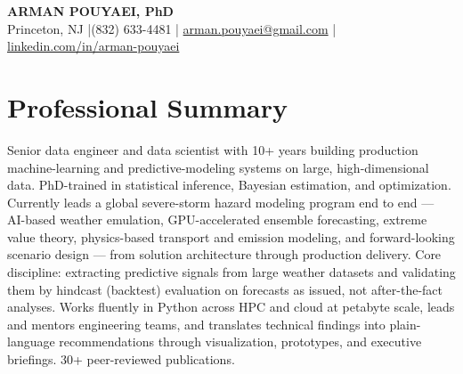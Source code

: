 \documentclass[10pt]{article}
\begin{document}
\fontsize{9}{10.3}\selectfont

\begin{center}
  {\large\bfseries ARMAN POUYAEI, PhD}\\[0.5ex]
  {\footnotesize Princeton, NJ \enspace|\enspace (832) 633-4481 \enspace|\enspace
  \href{mailto:arman.pouyaei@gmail.com}{arman.pouyaei@gmail.com} \enspace|\enspace
  \href{https://linkedin.com/in/arman-pouyaei}{linkedin.com/in/arman-pouyaei}}
\end{center}

\section*{Professional Summary}
Senior data engineer and data scientist with 10+ years building production
machine-learning and predictive-modeling systems on large, high-dimensional
data. PhD-trained in statistical inference, Bayesian estimation, and
optimization. Currently leads a global severe-storm hazard modeling program
end to end --- AI-based weather emulation, GPU-accelerated ensemble
forecasting, extreme value theory, physics-based transport and emission
modeling, and forward-looking scenario design --- from solution architecture
through production delivery. Core discipline: extracting predictive
signals from large weather datasets and validating them by hindcast
(backtest) evaluation on forecasts as issued, not after-the-fact analyses.
Works fluently in
Python across HPC and cloud at petabyte scale, leads and mentors engineering
teams, and translates technical findings into plain-language recommendations
through visualization, prototypes, and executive briefings. 30+ peer-reviewed
publications.

\end{document}
